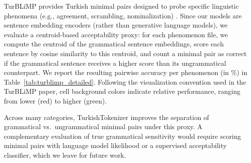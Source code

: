 TurBLiMP provides Turkish minimal pairs designed to probe specific linguistic phenomena (e.g., agreement, scrambling, nominalization) \cite{basar_turblimp_2025}. Since our models are sentence embedding encoders (rather than generative language models), we evaluate a centroid-based acceptability proxy: for each phenomenon file, we compute the centroid of the grammatical sentence embeddings, score each sentence by cosine similarity to this centroid, and count a minimal pair as correct if the grammatical sentence receives a higher score than its ungrammatical counterpart. We report the resulting pairwise accuracy per phenomenon (in \%) in Table~\ref{tab:turblimp_detailed}. Following the visualization convention used in the TurBLiMP paper, cell background colors indicate relative performance, ranging from lower (red) to higher (green).

\begin{table}[H]
\centering
\caption{TurBLiMP centroid-based pairwise accuracy by linguistic phenomenon.}
\label{tab:turblimp_detailed}
\resizebox{\linewidth}{!}{

}
\end{table}

Across many categories, TurkishTokenizer improves the separation of grammatical vs.\ ungrammatical minimal pairs under this proxy. A complementary evaluation of true grammatical sensitivity would require scoring minimal pairs with language model likelihood or a supervised acceptability classifier, which we leave for future work.

\FloatBarrier
